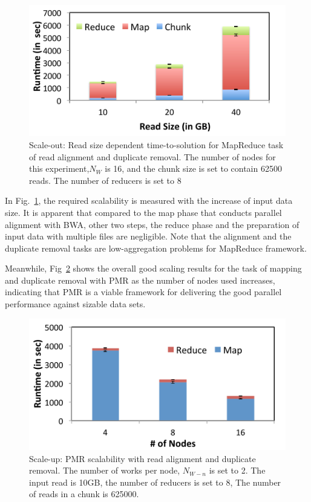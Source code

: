 \documentclass{sig-alternate}
\begin{document}
 \begin{figure}
 \centering
\includegraphics[scale=0.50]{figures/pj-smr-tts.pdf} 
\caption{\small Scale-out: Read size dependent time-to-solution for MapReduce task of read alignment and duplicate removal.  The number of nodes for this experiment,$N_W$ is 16, and the chunk size is set to contain 62500 reads.  The number of reducers is set to 8}
  \label{fig:read-size} 
\end{figure}

 In Fig.~\ref{fig:read-size}, the required scalability is measured with the increase of input data size.  It is apparent that compared to the map phase that conducts parallel alignment with BWA, other two steps, the reduce phase and the preparation of input data with multiple files are negligible.  Note that the alignment and the duplicate removal tasks are low-aggregation problems for MapReduce framework.  

Meanwhile, Fig~\ref{fig:scale-p-saga-mr} shows the overall good scaling results for the task of mapping and duplicate removal with PMR as the number of nodes used increases, indicating that PMR is a viable framework for delivering the good parallel performance against sizable data sets.





\begin{figure}
 \centering
\includegraphics[scale=0.50]{figures/pj-smr-scale.pdf}
\caption{\small Scale-up: PMR scalability with read alignment and duplicate removal.  The number of works per node, $N_{W-n}$ is set to 2.   The input read is 10GB, the number of reducers is set to 8, The number of reads in a chunk is 625000.}
  \label{fig:scale-p-saga-mr} 
\end{figure}
\end{document}
